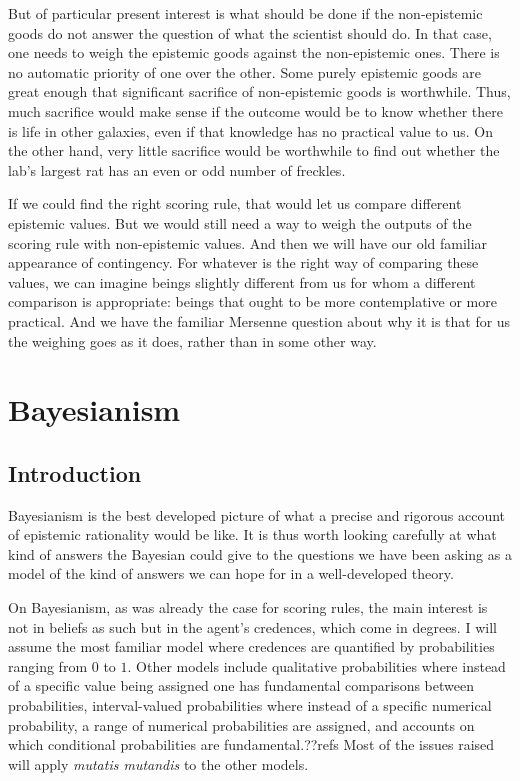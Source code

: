 But of particular present interest is what should be done if the non-epistemic
goods do not answer the question of what the scientist should do. In that case, one needs to weigh the
epistemic goods against the non-epistemic ones. There is no automatic priority of one over the other.
Some purely epistemic goods are great enough that significant sacrifice of non-epistemic goods is worthwhile.
Thus, much sacrifice would make sense if the outcome would be to know whether there is life in other galaxies,
even if that knowledge has no practical value to us. On the other hand, very little sacrifice
would be worthwhile to find out whether the lab's largest rat has an even or odd number of freckles.

If we could find the right scoring rule, that would let us compare different epistemic values. But we would
still need a way to weigh the outputs of the scoring rule with non-epistemic values. And then we will have
our old familiar appearance of contingency. For whatever is the right way of comparing these values, we can
imagine beings slightly different from us for whom a different comparison is appropriate: beings that ought
to be more contemplative or more practical. And we have the familiar Mersenne question about why it is that 
for us the weighing goes as it does, rather than in some other way.

\section{Bayesianism}
\subsection{Introduction}
Bayesianism is the best developed picture of what a precise and rigorous account of epistemic rationality would be like.
It is thus worth looking carefully at what kind of answers the Bayesian could give to the questions we have been asking
as a model of the kind of answers we can hope for in a well-developed theory.

On Bayesianism, as was already the case for  scoring rules, the main interest is not in beliefs as such but in the agent's credences, which come in degrees. 
I will assume the most familiar model where credences are quantified by probabilities ranging from $0$ to $1$. Other models include qualitative probabilities where instead of a specific value being assigned one has fundamental
comparisons between probabilities, interval-valued probabilities where instead of a specific numerical
probability, a range of numerical probabilities are assigned, and accounts on which conditional probabilities
are fundamental.??refs Most of the issues raised will apply 
\textit{mutatis mutandis} to the other models.

